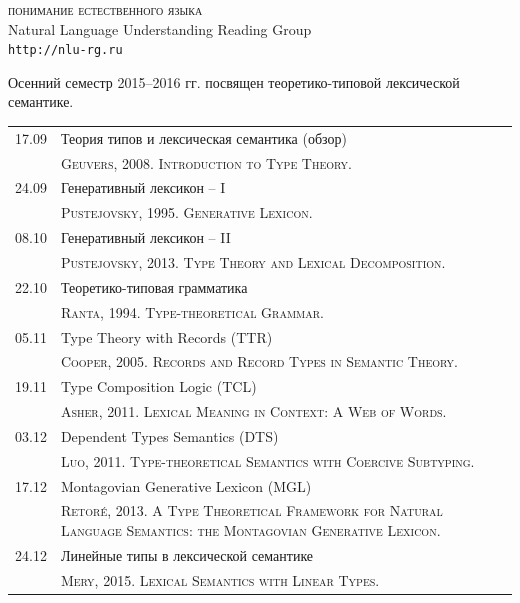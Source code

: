 \documentclass[12pt]{article}
\begin{document}

\parindent 0mm


\begin{center}
{\rm \Huge \textsc{понимание естественного языка}}\\
\bigskip
{\rm \Large Natural Language Understanding Reading Group}\\
\bigskip
{\rm \Large \texttt{http://nlu-rg.ru}}
\end{center}

\bigskip
\medskip

\begin{spacing}{1.2}
\hfill
\parbox{0.986\textwidth}{
Осенний семестр 2015--2016 гг. посвящен теоретико-типовой лексической семантике.
}
\end{spacing}

\medskip

\begin{table}[h!]
\begin{tabularx}{\textwidth}{cX}
17.09 & Теория типов и лексическая семантика (обзор) \bigstrut[t] \\
      & {\scriptsize \textsc{Geuvers, 2008. Introduction to Type Theory.}} \bigstrut[b] \\
24.09 & Генеративный лексикон -- I \bigstrut[t] \\
      & {\scriptsize \textsc{Pustejovsky, 1995. Generative Lexicon.}} \bigstrut[b] \\
08.10 & Генеративный лексикон -- II \bigstrut[t] \\
      & {\scriptsize \textsc{Pustejovsky, 2013. Type Theory and Lexical Decomposition.}} \bigstrut[b] \\
22.10 & Теоретико-типовая грамматика \bigstrut[t] \\
      & {\scriptsize \textsc{Ranta, 1994. Type-theoretical Grammar.}} \bigstrut[b] \\
05.11 & Type Theory with Records (TTR) \bigstrut[t] \\
      & {\scriptsize \textsc{Cooper, 2005. Records and Record Types in Semantic Theory.}} \bigstrut[b] \\
19.11 & Type Composition Logic (TCL)  \bigstrut[t] \\
      & {\scriptsize \textsc{Asher, 2011. Lexical Meaning in Context: A Web of Words.}} \bigstrut[b] \\
03.12 & Dependent Types Semantics (DTS)  \bigstrut[t] \\
      & {\scriptsize \textsc{Luo, 2011. Type-theoretical Semantics with Coercive Subtyping.}} \bigstrut[b] \\
17.12 & Montagovian Generative Lexicon (MGL) \bigstrut[t] \\ 
      & {\scriptsize \textsc{Retor\'{e}, 2013. A Type Theoretical Framework for Natural Language Semantics: the Montagovian Generative Lexicon.}} \bigstrut[b] \\ 
24.12 & Линейные типы в лексической семантике \bigstrut[t] \\
      & {\scriptsize \textsc{Mery, 2015. Lexical Semantics with Linear Types.}} \bigstrut[b] \\      
\end{tabularx}
\end{table}
\end{document}
